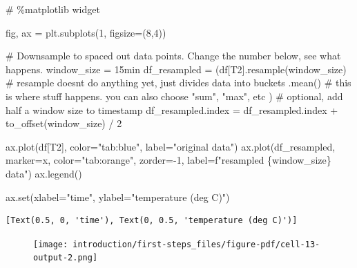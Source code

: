 \documentclass[
  letterpaper,
  DIV=11,
  numbers=noendperiod,
  oneside]{scrreprt}
\newenvironment{Shaded}{\begin{snugshade}}{\end{snugshade}}
\newcommand{\BuiltInTok}[1]{\textcolor[rgb]{0.00,0.23,0.31}{#1}}
\newcommand{\CommentTok}[1]{\textcolor[rgb]{0.37,0.37,0.37}{#1}}
\newcommand{\DecValTok}[1]{\textcolor[rgb]{0.68,0.00,0.00}{#1}}
\newcommand{\NormalTok}[1]{\textcolor[rgb]{0.00,0.23,0.31}{#1}}
\newcommand{\OperatorTok}[1]{\textcolor[rgb]{0.37,0.37,0.37}{#1}}
\newcommand{\SpecialCharTok}[1]{\textcolor[rgb]{0.37,0.37,0.37}{#1}}
\newcommand{\SpecialStringTok}[1]{\textcolor[rgb]{0.13,0.47,0.30}{#1}}
\newcommand{\StringTok}[1]{\textcolor[rgb]{0.13,0.47,0.30}{#1}}
\begin{document}
\begin{Shaded}
\begin{Highlighting}[]
\CommentTok{\# \%matplotlib widget}

\NormalTok{fig, ax }\OperatorTok{=}\NormalTok{ plt.subplots(}\DecValTok{1}\NormalTok{, figsize}\OperatorTok{=}\NormalTok{(}\DecValTok{8}\NormalTok{,}\DecValTok{4}\NormalTok{))}

\CommentTok{\# Downsample to spaced out data points. Change the number below, see what happens.}
\NormalTok{window\_size }\OperatorTok{=} \StringTok{\textquotesingle{}15min\textquotesingle{}}
\NormalTok{df\_resampled }\OperatorTok{=}\NormalTok{ (df[}\StringTok{\textquotesingle{}T2\textquotesingle{}}\NormalTok{].resample(window\_size)  }\CommentTok{\# resample doesn\textquotesingle{}t do anything yet, just divides data into buckets}
\NormalTok{                        .mean()                 }\CommentTok{\# this is where stuff happens. you can also choose "sum", "max", etc}
\NormalTok{               )}
\CommentTok{\# optional, add half a window size to timestamp}
\NormalTok{df\_resampled.index }\OperatorTok{=}\NormalTok{ df\_resampled.index }\OperatorTok{+}\NormalTok{ to\_offset(window\_size) }\OperatorTok{/} \DecValTok{2}

\NormalTok{ax.plot(df[}\StringTok{\textquotesingle{}T2\textquotesingle{}}\NormalTok{], color}\OperatorTok{=}\StringTok{"tab:blue"}\NormalTok{, label}\OperatorTok{=}\StringTok{"original data"}\NormalTok{)}
\NormalTok{ax.plot(df\_resampled, marker}\OperatorTok{=}\StringTok{\textquotesingle{}x\textquotesingle{}}\NormalTok{, color}\OperatorTok{=}\StringTok{"tab:orange"}\NormalTok{, zorder}\OperatorTok{={-}}\DecValTok{1}\NormalTok{,}
\NormalTok{        label}\OperatorTok{=}\SpecialStringTok{f"resampled }\SpecialCharTok{\{}\NormalTok{window\_size}\SpecialCharTok{\}}\SpecialStringTok{ data"}\NormalTok{)}
\NormalTok{ax.legend()}

\NormalTok{ax.}\BuiltInTok{set}\NormalTok{(xlabel}\OperatorTok{=}\StringTok{"time"}\NormalTok{,}
\NormalTok{       ylabel}\OperatorTok{=}\StringTok{"temperature (deg C)"}\NormalTok{)}
\end{Highlighting}
\end{Shaded}

\begin{verbatim}
[Text(0.5, 0, 'time'), Text(0, 0.5, 'temperature (deg C)')]
\end{verbatim}

\begin{figure}[H]

{\centering \texttt{[image: introduction/first-steps\_files/figure-pdf/cell-13-output-2.png]}

}

\end{figure}
\end{document}
